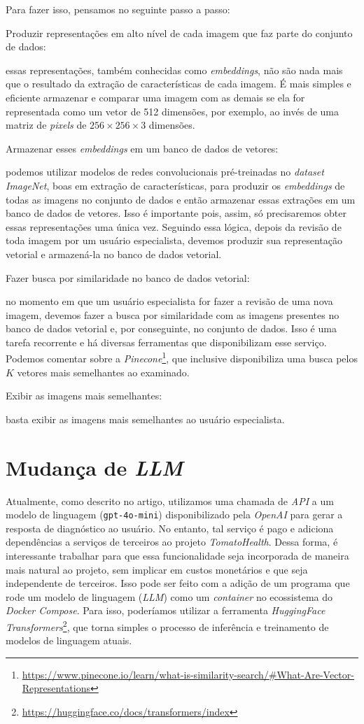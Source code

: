 Para fazer isso, pensamos no seguinte passo a passo:
\begin{enumerate}
    {\bf  \item Produzir representações em alto nível de cada imagem que faz parte do conjunto de dados:} essas representações, também conhecidas como \emph{embeddings}, não são nada mais que o resultado da extração de características de cada imagem. É mais simples e eficiente armazenar e comparar uma imagem com as demais se ela for representada como um vetor de 512 dimensões, por exemplo, ao invés de uma matriz de \emph{pixels} de $256 \times 256 \times 3$ dimensões.
    {\bf \item Armazenar esses \emph{embeddings} em um banco de dados de vetores:} podemos utilizar modelos de redes convolucionais pré-treinadas no \emph{dataset ImageNet}, boas em extração de características, para produzir os \emph{embeddings} de todas as imagens no conjunto de dados e então armazenar essas extrações em um banco de dados de vetores. Isso é importante pois, assim, só precisaremos obter essas representações uma única vez. Seguindo essa lógica, depois da revisão de toda imagem por um usuário especialista, devemos produzir sua representação vetorial e armazená-la no banco de dados vetorial.
    {\bf \item Fazer busca por similaridade no banco de dados vetorial:} no momento em que um usuário especialista for fazer a revisão de uma nova imagem, devemos fazer a busca por similaridade com as imagens presentes no banco de dados vetorial e, por conseguinte, no conjunto de dados. Isso é uma tarefa recorrente e há diversas ferramentas que disponibilizam esse serviço. Podemos comentar sobre a \emph{Pinecone}\footnote{\url{https://www.pinecone.io/learn/what-is-similarity-search/\#What-Are-Vector-Representations}}, que inclusive disponibiliza uma busca pelos $K$ vetores mais semelhantes ao examinado.
     {\bf \item Exibir as imagens mais semelhantes:} basta exibir as imagens mais semelhantes ao usuário especialista.
\end{enumerate}

\section{Mudança de \emph{LLM}}

Atualmente, como descrito no artigo, utilizamos uma chamada de \textit{API} a um modelo de linguagem (\texttt{gpt-4o-mini}) disponibilizado pela \textit{OpenAI} para gerar a resposta de diagnóstico ao usuário. No entanto, tal serviço é pago e adiciona dependências a serviços de terceiros ao projeto \emph{TomatoHealth}. Dessa forma, é interessante trabalhar para que essa funcionalidade seja incorporada de maneira mais natural ao projeto, sem implicar em custos monetários e que seja independente de terceiros. Isso pode ser feito com a adição de um programa que rode um modelo de linguagem (\emph{LLM}) como um \emph{container} no ecossistema do \emph{Docker Compose}. Para isso, poderíamos utilizar a ferramenta \emph{HuggingFace Transformers}\footnote{\url{https://huggingface.co/docs/transformers/index}}, que torna simples o processo de inferência e treinamento de modelos de linguagem atuais.
